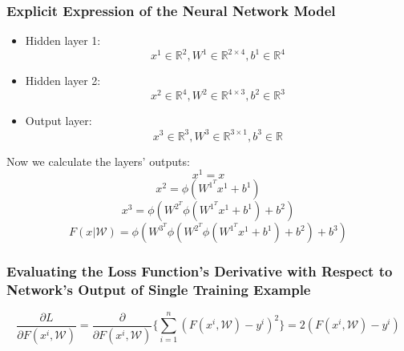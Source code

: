 \documentclass[12pt]{article}
\begin{document}
\subsubsection{Explicit Expression of the Neural Network Model}
\begin{itemize}
    \item Hidden layer 1:\\
$$x^1\in \mathbb{R}^{2}, W^1 \in \mathbb{R}^{2\times 4}, b^1\in \mathbb{R}^{4} $$
    \item Hidden layer 2:\\
$$x^2\in \mathbb{R}^{4}, W^2 \in \mathbb{R}^{4\times 3},  b^2\in \mathbb{R}^{3} $$
    \item Output layer:\\
$$x^3\in \mathbb{R}^{3}, W^3 \in \mathbb{R}^{3\times 1},  b^3\in \mathbb{R} $$
\end{itemize}
Now we calculate the layers' outputs:\\
$$x^1 = x$$
$$x^2 = \phi( W^{1^T} x^1 + b^1 )$$
$$x^3 = \phi( W^{2^T} \phi( W^{1^T} x^1 + b^1 ) + b^2)$$
$$F\left(x \vert \mathcal{W}\right) = \phi( W^{3^T} \phi( W^{2^T} \phi( W^{1^T} x^1 + b^1 ) + b^2) + b^3)$$
\subsubsection{Evaluating  the  Loss  Function’s  Derivative  with  Respect  to  Network’s Output of Single Training Example}
$$\frac{\partial L}{\partial F\left(x^i, \mathcal{W} \right)} = \frac{\partial }{\partial F\left(x^i, \mathcal{W} \right)}\{ \sum_{i=1}^{n} (F(x^i , \mathcal{W}) - y^i )^2\} = 2 (F(x^i , \mathcal{W}) - y^i)$$
\end{document}

